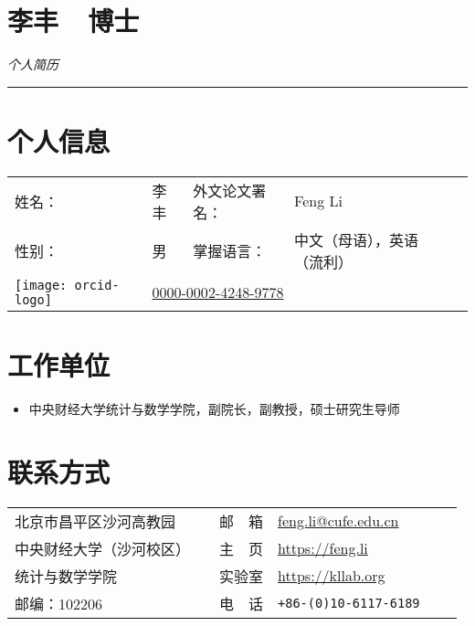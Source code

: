 \documentclass[twoside,a4paper,10pt]{amsart}
\begin{document}
\thispagestyle{plain}
\section*{\Huge{李丰~~博士}}
\begin{center}
  \emph{\huge 个人简历}
\end{center}
\rule{\textwidth}{.01cm}

\section*{个人信息}
\begin{tabular}{l p{4cm} l  l l}
  姓名：   & 李丰 & 外文论文署名： & Feng Li                                 \\
  性别：   & 男   & 掌握语言：     & 中文（母语），英语（流利）              \\
  \texttt{[image: orcid-logo]}   & \multicolumn{3}{l}{\href{https://orcid.org/0000-0002-4248-9778}{0000-0002-4248-9778}} \\
\end{tabular}

\section*{工作单位}

\begin{itemize}
\item [] 中央财经大学统计与数学学院，副院长，副教授，硕士研究生导师
\end{itemize}


\section*{联系方式}

\begin{tabular}{ l l |  l  l l l}
  北京市昌平区沙河高教园   &  & 邮　箱 & \href{mailto:feng.li@cufe.edu.cn}{\url{feng.li@cufe.edu.cn}} \\
  中央财经大学（沙河校区） &  & 主　页 & \url{https://feng.li}                                        \\
  统计与数学学院           &  & 实验室 & \url{https://kllab.org}                                      \\
  邮编：102206             &  & 电　话 & \texttt{+86-(0)10-6117-6189}                                 \\
\end{tabular}
\end{document}
